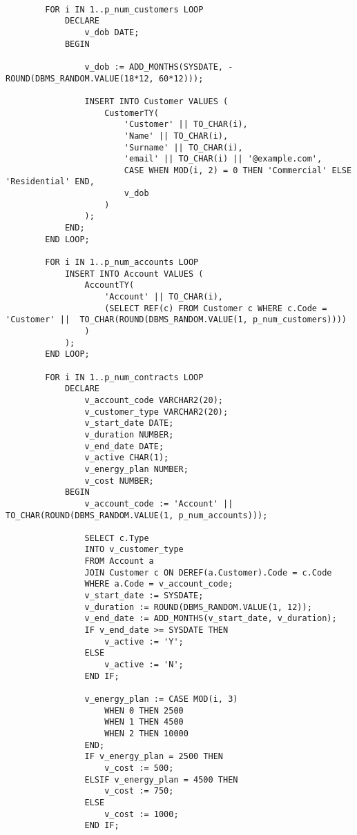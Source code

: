 \begin{lstlisting}
        
        
        
    
        FOR i IN 1..p_num_customers LOOP
            DECLARE
                v_dob DATE;
            BEGIN
               
                v_dob := ADD_MONTHS(SYSDATE, -ROUND(DBMS_RANDOM.VALUE(18*12, 60*12)));
    
                INSERT INTO Customer VALUES (
                    CustomerTY(
                        'Customer' || TO_CHAR(i),
                        'Name' || TO_CHAR(i),
                        'Surname' || TO_CHAR(i),
                        'email' || TO_CHAR(i) || '@example.com',
                        CASE WHEN MOD(i, 2) = 0 THEN 'Commercial' ELSE 'Residential' END,
                        v_dob
                    )
                );
            END;
        END LOOP;
    
        FOR i IN 1..p_num_accounts LOOP
            INSERT INTO Account VALUES (
                AccountTY(
                    'Account' || TO_CHAR(i),
                    (SELECT REF(c) FROM Customer c WHERE c.Code = 'Customer' ||  TO_CHAR(ROUND(DBMS_RANDOM.VALUE(1, p_num_customers))))
                )
            );
        END LOOP;
    
        FOR i IN 1..p_num_contracts LOOP
            DECLARE
                v_account_code VARCHAR2(20);
                v_customer_type VARCHAR2(20);
                v_start_date DATE;
                v_duration NUMBER;
                v_end_date DATE;
                v_active CHAR(1);
                v_energy_plan NUMBER;
                v_cost NUMBER;
            BEGIN
                v_account_code := 'Account' || TO_CHAR(ROUND(DBMS_RANDOM.VALUE(1, p_num_accounts)));

                SELECT c.Type 
                INTO v_customer_type
                FROM Account a
                JOIN Customer c ON DEREF(a.Customer).Code = c.Code
                WHERE a.Code = v_account_code;
                v_start_date := SYSDATE;
                v_duration := ROUND(DBMS_RANDOM.VALUE(1, 12));
                v_end_date := ADD_MONTHS(v_start_date, v_duration);
                IF v_end_date >= SYSDATE THEN
                    v_active := 'Y';
                ELSE
                    v_active := 'N';
                END IF;

                v_energy_plan := CASE MOD(i, 3)
                    WHEN 0 THEN 2500
                    WHEN 1 THEN 4500
                    WHEN 2 THEN 10000
                END;
                IF v_energy_plan = 2500 THEN
                    v_cost := 500;
                ELSIF v_energy_plan = 4500 THEN
                    v_cost := 750;
                ELSE
                    v_cost := 1000;
                END IF;
                


\end{lstlisting}
